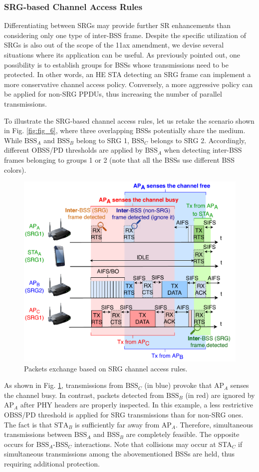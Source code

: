 \documentclass{article}
\begin{document}
\subsubsection{SRG-based Channel Access Rules}
\label{section:srg_channel_access}
Differentiating between SRGs may provide further SR enhancements than considering only one type of inter-BSS frame. Despite the specific utilization of SRGs is also out of the scope of the 11ax amendment, we devise several situations where its application can be useful. As previously pointed out, one possibility is to establish groups for BSSs whose transmissions need to be protected. In other words, an HE STA detecting an SRG frame can implement a more conservative channel access policy. Conversely, a more aggressive policy can be applied for non-SRG PPDUs, thus increasing the number of parallel transmissions. 

To illustrate the SRG-based channel access rules, let us retake the scenario shown in Fig. \ref{fig:fig_6}, where three overlapping BSSs potentially share the medium. While $\text{BSS}_A$ and $\text{BSS}_B$ belong to SRG 1, $\text{BSS}_C$ belongs to SRG 2. Accordingly, different OBSS/PD thresholds are applied by $\text{BSS}_A$ when detecting inter-BSS frames belonging to groups 1 or 2 (note that all the BSSs use different BSS colors).

\begin{figure}[ht!]
	\centering
	\includegraphics[width=.6\columnwidth]{fig_7}
	\caption{Packets exchange based on SRG channel access rules.}
	\label{fig:srg_channel_access}
\end{figure} 

As shown in Fig. \ref{fig:srg_channel_access}, transmissions from $\text{BSS}_C$ (in blue) provoke that $\text{AP}_A$ senses the channel busy. In contrast, packets detected from $\text{BSS}_B$ (in red) are ignored by $\text{AP}_A$ after PHY headers are properly inspected. In this example, a less restrictive OBSS/PD threshold is applied for SRG transmissions than for non-SRG ones. The fact is that $\text{STA}_B$ is sufficiently far away from $\text{AP}_A$. Therefore, simultaneous transmissions between $\text{BSS}_A$ and $\text{BSS}_B$ are completely feasible. The opposite occurs for $\text{BSS}_A$-$\text{BSS}_C$ interactions. Note that collisions may occur at STA$_C$ if simultaneous transmissions among the abovementioned BSSs are held, thus requiring additional protection.
\end{document}
